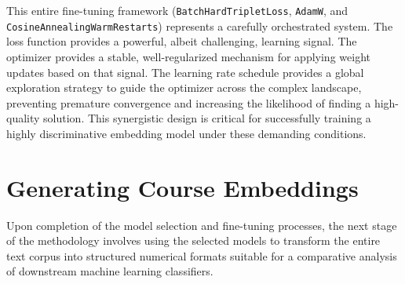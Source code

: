 This entire fine-tuning framework (\verb|BatchHardTripletLoss|, \verb|AdamW|, and \verb|CosineAnnealingWarmRestarts|) represents a carefully orchestrated system. The loss function provides a powerful, albeit challenging, learning signal. The optimizer provides a stable, well-regularized mechanism for applying weight updates based on that signal. The learning rate schedule provides a global exploration strategy to guide the optimizer across the complex landscape, preventing premature convergence and increasing the likelihood of finding a high-quality solution. This synergistic design is critical for successfully training a highly discriminative embedding model under these demanding conditions.{\setlength{\emergencystretch}{5em}\par}

\section{Generating Course Embeddings}
Upon completion of the model selection and fine-tuning processes, the next stage of the methodology involves using the selected models to transform the entire text corpus into structured numerical formats suitable for a comparative analysis of downstream machine learning classifiers.

